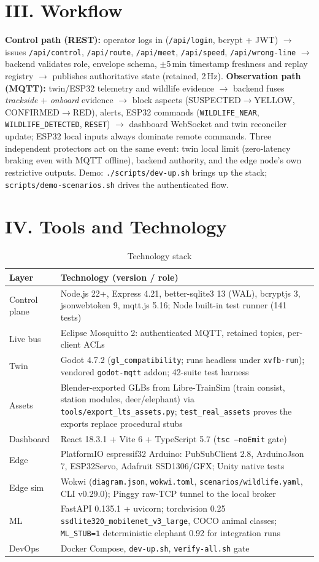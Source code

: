 \documentclass[10pt,a4paper,twocolumn]{article}
\newcommand{\sect}[1]{\section{#1}}
\begin{document}
\sect{III. Workflow}\label{sec:workflow}
\textbf{Control path (REST):} operator logs in (\texttt{/api/login}, bcrypt + JWT) $\rightarrow$ issues \texttt{/api/control}, \texttt{/api/route}, \texttt{/api/meet}, \texttt{/api/speed}, \texttt{/api/wrong-line} $\rightarrow$ backend validates role, envelope schema, $\pm$5\,min timestamp freshness and replay registry $\rightarrow$ publishes authoritative state (retained, 2\,Hz). \textbf{Observation path (MQTT):} twin/ESP32 telemetry and wildlife evidence $\rightarrow$ backend fuses \emph{trackside} + \emph{onboard} evidence $\rightarrow$ block aspects (SUSPECTED$\rightarrow$YELLOW, CONFIRMED$\rightarrow$RED), alerts, ESP32 commands (\texttt{WILDLIFE\_NEAR}, \texttt{WILDLIFE\_DETECTED}, \texttt{RESET}) $\rightarrow$ dashboard WebSocket and twin reconciler update; ESP32 local inputs always dominate remote commands. Three independent protectors act on the same event: twin local limit (zero-latency braking even with MQTT offline), backend authority, and the edge node's own restrictive outputs. Demo: \texttt{./scripts/dev-up.sh} brings up the stack; \texttt{scripts/demo-scenarios.sh} drives the authenticated flow.

\sect{IV. Tools and Technology}
\begin{table}[H]\scriptsize
\caption{Technology stack}\label{tab:stack}
\begin{tabularx}{\linewidth}{p{1.7cm} X}
\toprule
\textbf{Layer} & \textbf{Technology (version / role)}\\
\midrule
Control plane & Node.js 22+, Express 4.21, better-sqlite3 13 (WAL), bcryptjs 3, jsonwebtoken 9, mqtt.js 5.16; Node built-in test runner (141 tests)\\
Live bus & Eclipse Mosquitto 2: authenticated MQTT, retained topics, per-client ACLs\\
Twin & Godot 4.7.2 (\texttt{gl\_compatibility}; runs headless under \texttt{xvfb-run}); vendored \texttt{godot-mqtt} addon; 42-suite test harness\\
Assets & Blender-exported GLBs from Libre-TrainSim (train consist, station modules, deer/elephant) via \texttt{tools/export\_lts\_assets.py}; \texttt{test\_real\_assets} proves the exports replace procedural stubs\\
Dashboard & React 18.3.1 + Vite 6 + TypeScript 5.7 (\texttt{tsc --noEmit} gate)\\
Edge & PlatformIO espressif32 Arduino: PubSubClient 2.8, ArduinoJson 7, ESP32Servo, Adafruit SSD1306/GFX; Unity native tests\\
Edge sim & Wokwi (\texttt{diagram.json}, \texttt{wokwi.toml}, \texttt{scenarios/wildlife.yaml}, CLI v0.29.0); Pinggy raw-TCP tunnel to the local broker\\
ML & FastAPI 0.135.1 + uvicorn; torchvision 0.25 \texttt{ssdlite320\_mobilenet\_v3\_large}, COCO animal classes; \texttt{ML\_STUB=1} deterministic elephant 0.92 for integration runs\\
DevOps & Docker Compose, \texttt{dev-up.sh}, \texttt{verify-all.sh} gate\\
\bottomrule
\end{tabularx}
\end{table}
\end{document}

